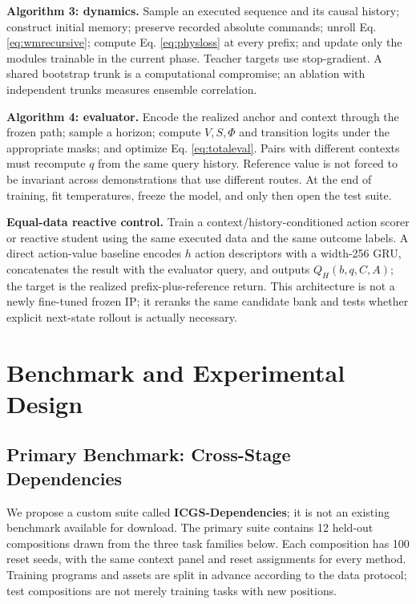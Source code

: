 \documentclass[
  10pt,
]{article}
\begin{document}
\textbf{Algorithm 3: dynamics.} Sample an executed sequence and its causal history; construct initial memory; preserve recorded absolute commands; unroll Eq. \eqref{eq:wmrecursive}; compute Eq. \eqref{eq:physloss} at every prefix; and update only the modules trainable in the current phase. Teacher targets use stop-gradient. A shared bootstrap trunk is a computational compromise; an ablation with independent trunks measures ensemble correlation.

\textbf{Algorithm 4: evaluator.} Encode the realized anchor and context through the frozen path; sample a horizon; compute \(V,S,\Phi\) and transition logits under the appropriate masks; and optimize Eq. \eqref{eq:totaleval}. Pairs with different contexts must recompute \(q\) from the same query history. Reference value is not forced to be invariant across demonstrations that use different routes. At the end of training, fit temperatures, freeze the model, and only then open the test suite.

\textbf{Equal-data reactive control.} Train a context/history-conditioned action scorer or reactive student using the same executed data and the same outcome labels. A direct action-value baseline encodes \(h\) action descriptors with a width-256 GRU, concatenates the result with the evaluator query, and outputs \(Q_H(b,q,C,A)\); the target is the realized prefix-plus-reference return. This architecture is not a newly fine-tuned frozen IP; it reranks the same candidate bank and tests whether explicit next-state rollout is actually necessary.

\hypertarget{benchmark-vuxe0-thiux1ebft-kux1ebf-thux1ef1c-nghiux1ec7m}{%
\section{Benchmark and Experimental Design}\label{benchmark-vuxe0-thiux1ebft-kux1ebf-thux1ef1c-nghiux1ec7m}}

\hypertarget{primary-benchmark-phux1ee5-thuux1ed9c-giux1eefa-cuxe1c-giai-ux111oux1ea1n}{%
\subsection{Primary Benchmark: Cross-Stage Dependencies}\label{primary-benchmark-phux1ee5-thuux1ed9c-giux1eefa-cuxe1c-giai-ux111oux1ea1n}}

We propose a custom suite called \textbf{ICGS-Dependencies}; it is not an existing benchmark available for download. The primary suite contains 12 held-out compositions drawn from the three task families below. Each composition has 100 reset seeds, with the same context panel and reset assignments for every method. Training programs and assets are split in advance according to the data protocol; test compositions are not merely training tasks with new positions.
\end{document}
